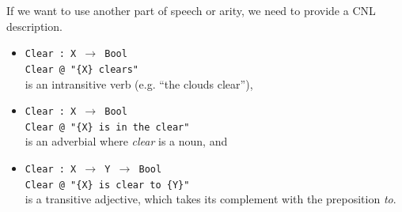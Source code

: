 \documentclass[11pt]{article}
\begin{document}
\noindent If we want to use another part of speech or arity, we need to provide a CNL description.
    \begin{itemize}
        \item \texttt{\small Clear~:~X $\rightarrow$ Bool} \\ 
              \texttt{\small {\color{white}Clear~}@ "\{X\} clears"} \\      %
              is an intransitive verb (e.g. ``the clouds clear''),
        \item \texttt{\small Clear~:~X $\rightarrow$ Bool} \\ %
              \texttt{\small {\color{white}Clear~}@ "\{X\} is in the clear"} \\ is an adverbial where {\it clear} is a noun, and 
        \item \texttt{\small Clear~:~X $\rightarrow$ Y $\rightarrow$ Bool} \\ 
              \texttt{\small {\color{white}Clear~}@ "\{X\} is clear to \{Y\}"} \\      %
              is a transitive adjective, which takes its complement with the preposition {\it to}.
              

    \end{itemize}





\end{document}
